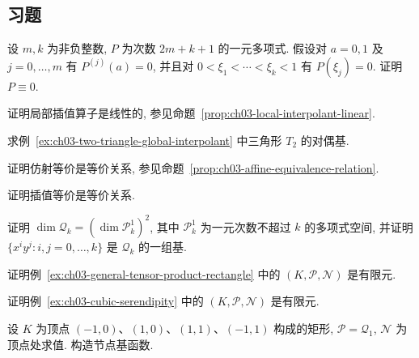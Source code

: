\subsection*{习题}
\label{sec:ch03-exercises}
\setcounter{exerciseitem}{0}

\begin{MBExercise}
\label{exr:ch03-01}
设 $m,k$ 为非负整数, $P$ 为次数 $2m+k+1$ 的一元多项式. 假设对 $a=0,1$ 及 $j=0,\ldots,m$ 有 $P^{(j)}(a)=0$, 并且对 $0<\xi_1<\cdots<\xi_k<1$ 有 $P(\xi_j)=0$. 证明 $P\equiv0$.
\end{MBExercise}

\begin{MBExercise}
\label{exr:ch03-02}
证明局部插值算子是线性的, 参见命题~\ref{prop:ch03-local-interpolant-linear}.
\end{MBExercise}

\begin{MBExercise}
\label{exr:ch03-03}
求例~\ref{ex:ch03-two-triangle-global-interpolant} 中三角形 $T_2$ 的对偶基.
\end{MBExercise}

\begin{MBExercise}
\label{exr:ch03-04}
证明仿射等价是等价关系, 参见命题~\ref{prop:ch03-affine-equivalence-relation}.
\end{MBExercise}

\begin{MBExercise}
\label{exr:ch03-05}
证明插值等价是等价关系.
\end{MBExercise}

\begin{MBExercise}
\label{exr:ch03-06}
证明 $\dim\mathcal Q_k=(\dim\mathcal P_k^1)^2$, 其中 $\mathcal P_k^1$ 为一元次数不超过 $k$ 的多项式空间, 并证明 $\{x^iy^j:i,j=0,\ldots,k\}$ 是 $\mathcal Q_k$ 的一组基.
\end{MBExercise}

\begin{MBExercise}
\label{exr:ch03-07}
证明例~\ref{ex:ch03-general-tensor-product-rectangle} 中的 $(K,\mathcal P,\mathcal N)$ 是有限元.
\end{MBExercise}

\begin{MBExercise}
\label{exr:ch03-08}
证明例~\ref{ex:ch03-cubic-serendipity} 中的 $(K,\mathcal P,\mathcal N)$ 是有限元.
\end{MBExercise}

\begin{MBExercise}
\label{exr:ch03-09}
设 $K$ 为顶点 $(-1,0)$、$(1,0)$、$(1,1)$、$(-1,1)$ 构成的矩形, $\mathcal P=\mathcal Q_1$, $\mathcal N$ 为顶点处求值. 构造节点基函数.
\end{MBExercise}

